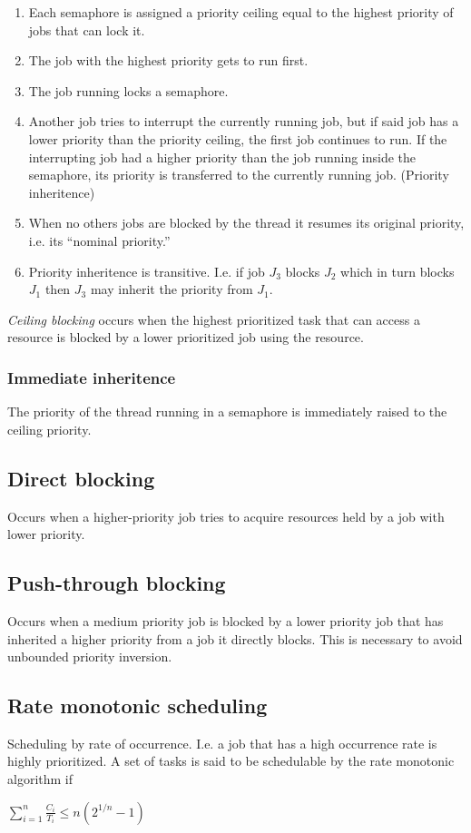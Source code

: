 \documentclass[a4paper]{article}
\begin{document}
\begin{enumerate}
  \item Each semaphore is assigned a priority ceiling equal to the highest
        priority of jobs that can lock it.
  \item The job with the highest priority gets to run first.
  \item The job running locks a semaphore.
  \item Another job tries to interrupt the currently running job, but if said
        job has a lower priority than the priority ceiling, the first job
        continues to run. If the interrupting job had a higher priority than
        the job running inside the semaphore, its priority is transferred to the
        currently running job. (Priority inheritence)
  \item When no others jobs are blocked by the thread it resumes its original
        priority, i.e. its ``nominal priority.''
  \item Priority inheritence is transitive. I.e. if job $J_3$ blocks $J_2$ which
        in turn blocks $J_1$ then $J_3$ may inherit the priority from $J_1$.
\end{enumerate}

\emph{Ceiling blocking} occurs when the highest prioritized task that can access
a resource is blocked by a lower prioritized job using the resource.

\subsubsection{Immediate inheritence}
The priority of the thread running in a semaphore is immediately raised to the
ceiling priority.

\subsection{Direct blocking}
Occurs when a higher-priority job tries to acquire resources held by a job
with lower priority.

\subsection{Push-through blocking}
Occurs when a medium priority job is blocked by a lower priority job that has
inherited a higher priority from a job it directly blocks. This is necessary
to avoid unbounded priority inversion.

\subsection{Rate monotonic scheduling}
Scheduling by rate of occurrence. I.e. a job that has a high occurrence rate is
highly prioritized. A set of tasks is said to be schedulable by the rate monotonic 
algorithm if 
\begin{center}
  $\sum_{i=1}^{n} \frac{C_i}{T_i} \leq n(2^{1/n}-1)$
\end{center}
\end{document}
